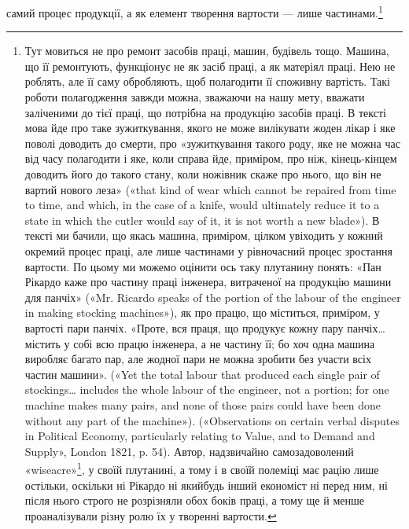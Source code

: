 \parcont{}  %
самий процес продукції, а як елемент творення вартости — лише
частинами.\footnote{
Тут мовиться не про ремонт засобів праці, машин, будівель тощо.
Машина, що її ремонтують, функціонує не як засіб праці, а як матеріял
праці. Нею не роблять, але її саму обробляють, щоб полагодити її споживну
вартість. Такі роботи полагодження завжди можна, зважаючи
на нашу мету, вважати заліченими до тієї праці, що потрібна на продукцію
засобів праці. В тексті мова йде про таке зужиткування, якого не може
вилікувати жоден лікар і яке поволі доводить до смерти, про «зужиткування
такого роду, яке не можна час від часу полагодити і яке, коли справа
йде, приміром, про ніж, кінець-кінцем доводить його до такого стану,
коли ножівник скаже про нього, що він не вартий нового леза» («that
kind of wear which cannot be repaired from time to time, and which, in the
case of a knife, would ultimately reduce it to a state in which the cutler
would say of it, it is not worth a new blade»). В тексті ми бачили, що якась
машина, приміром, цілком увіходить у кожний окремий процес праці,
але лише частинами у рівночасний процес зростання вартости. По цьому
ми можемо оцінити ось таку плутанину понять: «Пан Рікардо каже про
частину праці інженера, витраченої на продукцію машини для панчіх»
(«Mr. Ricardo speaks of the portion of the labour of the engineer in making
stocking machines»), як про працю, що міститься, приміром, у вартості
пари панчіх. «Проте, вся праця, що продукує кожну пару панчіх\dots{} містить
у собі всю працю інженера, а не частину її; бо хоч одна машина виробляє
багато пар, але жодної пари не можна зробити без участи всіх частин
машини». («Yet the total labour that produced each single pair of stockings\dots{}
includes the whole labour of the engineer, not a portion; for one
machine makes many pairs, and none of those pairs could have been done
without any part of the machine»). («Observations on certain verbal disputes
in Political Economy, particularly relating to Value, and to Demand and
Supply», London 1821, p. 54). Автор, надзвичайно самозадоволений
«wiseacre»\footnote*{
— удаваний мудрак, самозадоволений дурень. \emph{Ред.}
}, у своїй плутанині, а тому і в своїй полеміці має рацію лише
остільки, оскільки ні Рікардо ні якийбудь інший економіст ні перед
ним, ні після нього строго не розрізняли обох боків праці, а тому ще
й менше проаналізували різну ролю їх у творенні вартости.
}

